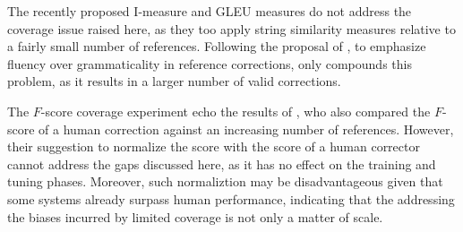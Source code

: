 \documentclass[letterpaper, 11pt]{article}
\newcommand{\lc}[1]{\footnote{\color{blue}LC: #1}}
\begin{document}
The recently proposed {\sc I-measure} \cite{felice2015towards} and GLEU \cite{napoles2015ground} measures do not address
the coverage issue raised here, as they too apply string similarity measures relative to a fairly small number of references.
Following the proposal of , to emphasize fluency over grammaticality in reference corrections, only compounds this problem, as it results in a larger number of valid corrections.

The $F$-score coverage experiment echo the results of ,
who also compared the $F$-score of a human correction against an increasing number of references.
However, their suggestion to normalize the score
with the score of a human corrector cannot address the gaps discussed here,
as it has no effect on the training and tuning phases.
Moreover, such normaliztion may be disadvantageous given that some systems already surpass human performance,
indicating that the addressing the biases incurred by limited coverage is not only a matter of scale.


\end{document}
